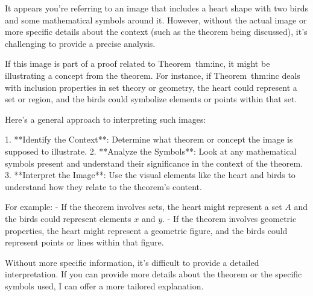 It appears you're referring to an image that includes a heart shape with two birds and some mathematical symbols around it. However, without the actual image or more specific details about the context (such as the theorem being discussed), it's challenging to provide a precise analysis.

If this image is part of a proof related to Theorem~thm:inc, it might be illustrating a concept from the theorem. For instance, if Theorem~thm:inc deals with inclusion properties in set theory or geometry, the heart could represent a set or region, and the birds could symbolize elements or points within that set.

Here’s a general approach to interpreting such images:

1. **Identify the Context**: Determine what theorem or concept the image is supposed to illustrate.
2. **Analyze the Symbols**: Look at any mathematical symbols present and understand their significance in the context of the theorem.
3. **Interpret the Image**: Use the visual elements like the heart and birds to understand how they relate to the theorem's content.

For example:
- If the theorem involves sets, the heart might represent a set \( A \) and the birds could represent elements \( x \) and \( y \).
- If the theorem involves geometric properties, the heart might represent a geometric figure, and the birds could represent points or lines within that figure.

Without more specific information, it's difficult to provide a detailed interpretation. If you can provide more details about the theorem or the specific symbols used, I can offer a more tailored explanation.